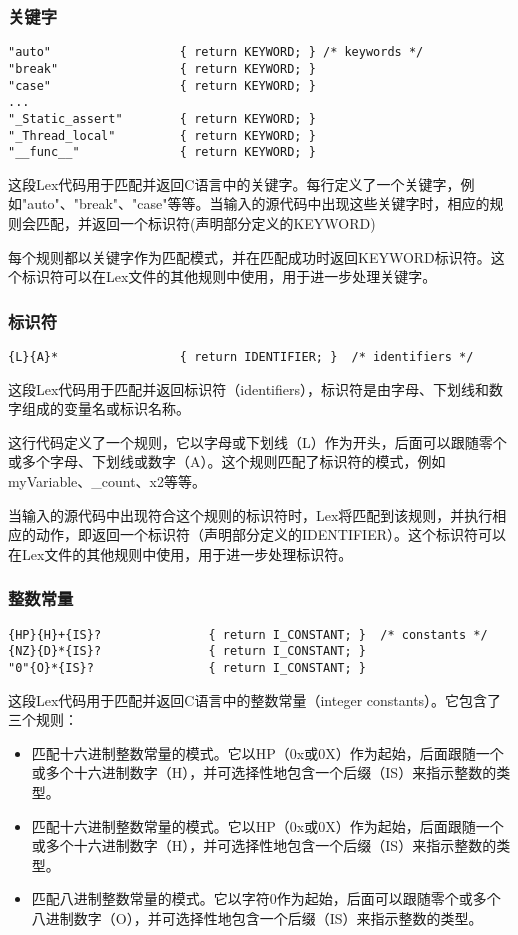 \documentclass[lang=cn,11pt,a4paper]{elegantpaper}
\begin{document}
\subsubsection{关键字}
\begin{lstlisting}
"auto"					{ return KEYWORD; } /* keywords */
"break"					{ return KEYWORD; }
"case"					{ return KEYWORD; }
...
"_Static_assert"        { return KEYWORD; }
"_Thread_local"         { return KEYWORD; }
"__func__"              { return KEYWORD; }
\end{lstlisting}

这段Lex代码用于匹配并返回C语言中的关键字。每行定义了一个关键字，例如"auto"、"break"、"case"等等。当输入的源代码中出现这些关键字时，相应的规则会匹配，并返回一个标识符(声明部分定义的KEYWORD)

每个规则都以关键字作为匹配模式，并在匹配成功时返回KEYWORD标识符。这个标识符可以在Lex文件的其他规则中使用，用于进一步处理关键字。

\subsubsection{标识符}
\begin{lstlisting}
{L}{A}*					{ return IDENTIFIER; }  /* identifiers */
\end{lstlisting}

这段Lex代码用于匹配并返回标识符（identifiers），标识符是由字母、下划线和数字组成的变量名或标识名称。

这行代码定义了一个规则，它以字母或下划线（L）作为开头，后面可以跟随零个或多个字母、下划线或数字（A）。这个规则匹配了标识符的模式，例如myVariable、\_count、x2等等。

当输入的源代码中出现符合这个规则的标识符时，Lex将匹配到该规则，并执行相应的动作，即返回一个标识符（声明部分定义的IDENTIFIER）。这个标识符可以在Lex文件的其他规则中使用，用于进一步处理标识符。

\subsubsection{整数常量}
\begin{lstlisting}
{HP}{H}+{IS}?			    { return I_CONSTANT; }  /* constants */
{NZ}{D}*{IS}?			    { return I_CONSTANT; }
"0"{O}*{IS}?		    	{ return I_CONSTANT; }
\end{lstlisting}

这段Lex代码用于匹配并返回C语言中的整数常量（integer constants）。它包含了三个规则：
\begin{itemize}
    \item 匹配十六进制整数常量的模式。它以HP（0x或0X）作为起始，后面跟随一个或多个十六进制数字（H），并可选择性地包含一个后缀（IS）来指示整数的类型。
    \item 匹配十六进制整数常量的模式。它以HP（0x或0X）作为起始，后面跟随一个或多个十六进制数字（H），并可选择性地包含一个后缀（IS）来指示整数的类型。
    \item 匹配八进制整数常量的模式。它以字符0作为起始，后面可以跟随零个或多个八进制数字（O），并可选择性地包含一个后缀（IS）来指示整数的类型。
\end{itemize}
\end{document}
